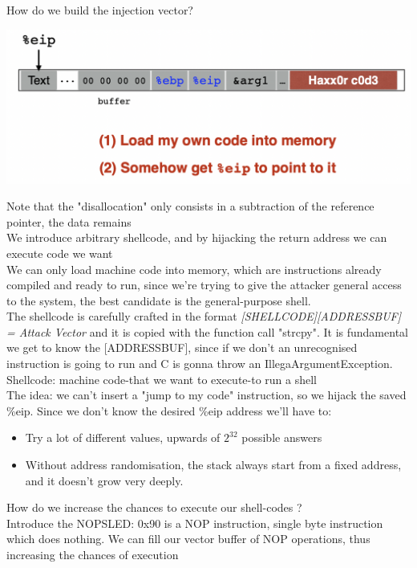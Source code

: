 \documentclass[11pt, oneside]{article}   	%
\begin{document}
How do we build the injection vector?
\begin{center}
\includegraphics[scale = 0.4]{injcode}
\end{center}
{\footnotesize Note that the "disallocation" only consists in a subtraction of the reference pointer, the data remains\\
We introduce arbitrary shellcode, and by hijacking the return address we can execute code we want}\\
We can only load machine code into memory, which are instructions already compiled and ready to run, since we're trying to give the attacker general access to the system, the best candidate is the general-purpose shell. \\The shellcode is carefully crafted in the format \emph{[SHELLCODE][ADDRESSBUF] = Attack Vector} and it is copied with the function call "strcpy".
It is fundamental we get to know the [ADDRESSBUF], since if we don't an unrecognised instruction is going to run and C is gonna throw an IllegaArgumentException.\\
{\footnotesize Shellcode: machine code-that we want to execute-to run a shell}\\
The idea: we can't insert a "jump to my code" instruction, so we hijack the saved \%eip. Since we don't know the desired \%eip address we'll have to:\begin{itemize}
\item Try a lot of different values, upwards of $2^{32}$ possible answers\\
\item Without address randomisation, the stack always start from a fixed address, and it doesn't grow very deeply.
\end{itemize}
How do we increase the chances to execute our shell-codes ?\\
Introduce the NOPSLED: 0x90 is a NOP instruction, single byte instruction which does nothing.
We can fill our vector buffer of NOP operations, thus increasing the chances of execution
\end{document}
